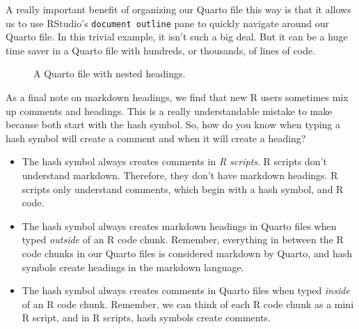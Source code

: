 \documentclass[
  letterpaper,
  DIV=11,
  numbers=noendperiod]{scrreprt}
\begin{document}
A really important benefit of organizing our Quarto file this way is
that it allows us to use RStudio's \texttt{document\ outline} pane to
quickly navigate around our Quarto file. In this trivial example, it
isn't such a big deal. But it can be a huge time saver in a Quarto file
with hundreds, or thousands, of lines of code.

\begin{figure}


\caption{\label{fig-quarto-headings}A Quarto file with nested headings.}

\end{figure}%

As a final note on markdown headings, we find that new R users sometimes
mix up comments and headings. This is a really understandable mistake to
make because both start with the hash symbol. So, how do you know when
typing a hash symbol will create a comment and when it will create a
heading?

\begin{itemize}
\item
  The hash symbol always creates comments in \emph{R scripts}. R scripts
  don't understand markdown. Therefore, they don't have markdown
  headings. R scripts only understand comments, which begin with a hash
  symbol, and R code.
\item
  The hash symbol always creates markdown headings in Quarto files when
  typed \emph{outside} of an R code chunk. Remember, everything in
  between the R code chunks in our Quarto files is considered markdown
  by Quarto, and hash symbols create headings in the markdown language.
\item
  The hash symbol always creates comments in Quarto files when typed
  \emph{inside} of an R code chunk. Remember, we can think of each R
  code chunk as a mini R script, and in R scripts, hash symbols create
  comments.
\end{itemize}
\end{document}
